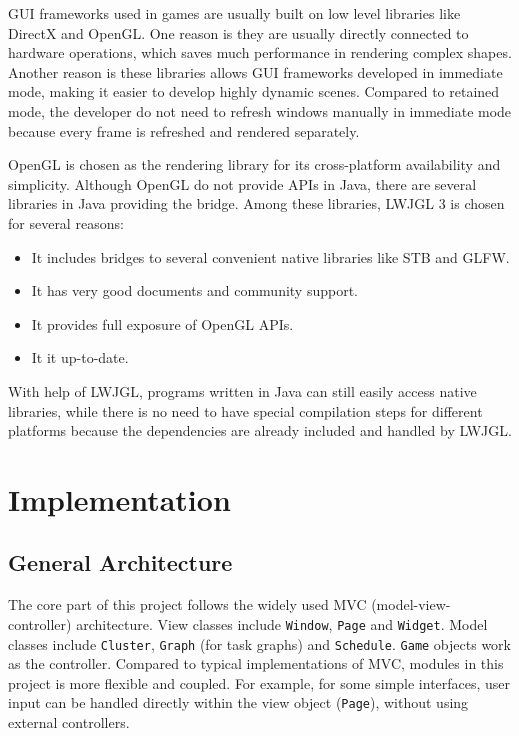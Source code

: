 \documentclass[msc,deptreport, cs]{infthesis}
\begin{document}
GUI frameworks used in games are usually built on low level libraries like DirectX and OpenGL. One reason is they are usually directly connected to hardware operations, which saves much performance in rendering complex shapes. Another reason is these libraries allows GUI frameworks developed in immediate mode, making it easier to develop highly dynamic scenes. Compared to retained mode, the developer do not need to refresh windows manually in immediate mode because every frame is refreshed and rendered separately.

OpenGL is chosen as the rendering library for its cross-platform availability and simplicity. Although OpenGL do not provide APIs in Java, there are several libraries in Java providing the bridge. Among these libraries, LWJGL 3 is chosen for several reasons:

\begin{itemize}
  \vspace{-1em}\item It includes bridges to several convenient native libraries like STB and GLFW.
  \vspace{-1em}\item It has very good documents and community support.
  \vspace{-1em}\item It provides full exposure of OpenGL APIs.
  \vspace{-1em}\item It it up-to-date.
\end{itemize}

With help of LWJGL, programs written in Java can still easily access native libraries, while there is no need to have special compilation steps for different platforms because the dependencies are already included and handled by LWJGL.

\chapter{Implementation}

\section{General Architecture} \label{sec:architecture}

The core part of this project follows the widely used MVC (model-view-controller) architecture. View classes include \verb+Window+, \verb+Page+ and \verb+Widget+. Model classes include \verb+Cluster+, \verb+Graph+ (for task graphs) and \verb+Schedule+. \verb+Game+ objects work as the controller. Compared to typical implementations of MVC, modules in this project is more flexible and coupled. For example, for some simple interfaces, user input can be handled directly within the view object (\verb+Page+), without using external controllers.
\end{document}
